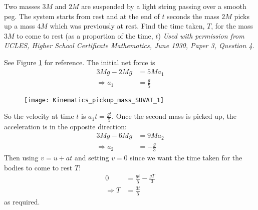 \begin{problem} %
 {Two masses $3M$ and $2M$ are suspended by a light string passing over a smooth peg. The system starts from rest and at the end of $t$ seconds the mass $2M$ picks up a mass $4M$ which was previously at rest.  Find the time taken, $T$, for the mass $3M$ to come to rest (as a proportion of the time, $t$)}
{\textit{Used with permission from UCLES, Higher School Certificate Mathematics, June 1930, Paper 3, Question 4.}}
{See Figure \ref{fig:Kinematics_pickup_mass_SUVAT_1} for reference.
The initial net force is
\begin{align*}
3Mg-2Mg&=5Ma_1 \\
\Rightarrow a_1&=\frac{g}{5}
\end{align*}

\begin{figure}[h]
	\centering
	\texttt{[image: Kinematics\_pickup\_mass\_SUVAT\_1]}
	\caption{}
	\label{fig:Kinematics_pickup_mass_SUVAT_1}
\end{figure}

So the velocity at time $t$ is $a_1t=\frac{gt}{5}$. Once the second mass is picked up, the acceleration is in the opposite direction:
\begin{align*}
3Mg-6Mg&=9Ma_2 \\
\Rightarrow a_2&=-\frac{g}{3}
\end{align*}
Then using $v=u+at$ and setting $v=0$ since we want the time taken for the bodies to come to rest $T$:
\begin{align*}
0&=\frac{gt}{5}-\frac{gT}{3} \\
\Rightarrow T&=\frac{3t}{5}
\end{align*}
as required. 
}
\end{problem}